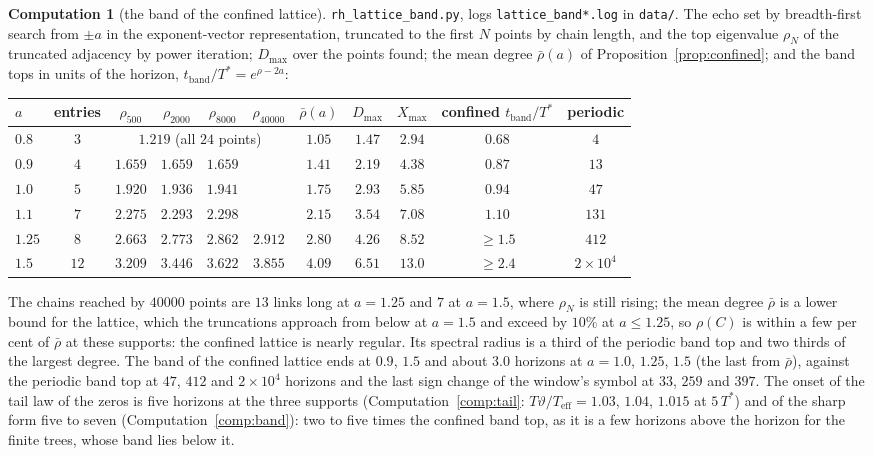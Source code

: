 \documentclass[11pt]{article}
\theoremstyle{definition}
\newtheorem{computation}[theorem]{Computation}
\theoremstyle{remark}
\newcommand{\Tst}{T^{*}}
\begin{document}
\begin{computation}[the band of the confined lattice]\label{comp:confined}
\texttt{rh\_lattice\_band.py}, logs \texttt{lattice\_band*.log} in \texttt{data/}. The echo set by breadth-first search from $\pm a$ in the exponent-vector representation, truncated to the first $N$ points by chain length, and the top eigenvalue $\rho_N$ of the truncated adjacency by power iteration; $D_{\max}$ over the points found; the mean degree $\bar\rho(a)$ of Proposition~\ref{prop:confined}; and the band tops in units of the horizon, $t_{\mathrm{band}}/\Tst=e^{\rho-2a}$:
\begin{center}\footnotesize
\begin{tabular}{@{}lcccccccccc@{}}
\toprule
$a$ & entries & $\rho_{500}$ & $\rho_{2000}$ & $\rho_{8000}$ & $\rho_{40000}$ & $\bar\rho(a)$ & $D_{\max}$ & $X_{\max}$ & confined $t_{\mathrm{band}}/\Tst$ & periodic\\
\midrule
$0.8$ & $3$ & \multicolumn{4}{c}{$1.219$ (all $24$ points)} & $1.05$ & $1.47$ & $2.94$ & $0.68$ & $4$\\
$0.9$ & $4$ & $1.659$ & $1.659$ & $1.659$ & & $1.41$ & $2.19$ & $4.38$ & $0.87$ & $13$\\
$1.0$ & $5$ & $1.920$ & $1.936$ & $1.941$ & & $1.75$ & $2.93$ & $5.85$ & $0.94$ & $47$\\
$1.1$ & $7$ & $2.275$ & $2.293$ & $2.298$ & & $2.15$ & $3.54$ & $7.08$ & $1.10$ & $131$\\
$1.25$ & $8$ & $2.663$ & $2.773$ & $2.862$ & $2.912$ & $2.80$ & $4.26$ & $8.52$ & $\ge1.5$ & $412$\\
$1.5$ & $12$ & $3.209$ & $3.446$ & $3.622$ & $3.855$ & $4.09$ & $6.51$ & $13.0$ & $\ge2.4$ & $2\times10^4$\\
\bottomrule
\end{tabular}
\end{center}
The chains reached by $40000$ points are $13$ links long at $a=1.25$ and $7$ at $a=1.5$, where $\rho_N$ is still rising; the mean degree $\bar\rho$ is a lower bound for the lattice, which the truncations approach from below at $a=1.5$ and exceed by $10\%$ at $a\le1.25$, so $\rho(C)$ is within a few per cent of $\bar\rho$ at these supports: the confined lattice is nearly regular. Its spectral radius is a third of the periodic band top and two thirds of the largest degree. The band of the confined lattice ends at $0.9$, $1.5$ and about $3.0$ horizons at $a=1.0$, $1.25$, $1.5$ (the last from $\bar\rho$), against the periodic band top at $47$, $412$ and $2\times10^4$ horizons and the last sign change of the window's symbol at $33$, $259$ and $397$. The onset of the tail law of the zeros is five horizons at the three supports (Computation~\ref{comp:tail}: $T\vartheta/T_{\mathrm{eff}}=1.03$, $1.04$, $1.015$ at $5\,\Tst$) and of the sharp form five to seven (Computation~\ref{comp:band}): two to five times the confined band top, as it is a few horizons above the horizon for the finite trees, whose band lies below it.


\end{computation}
\end{document}
